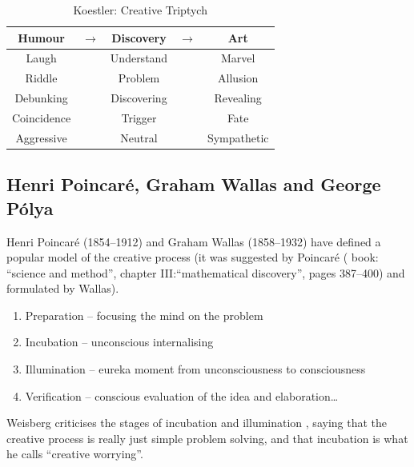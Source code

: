 \begin{table}[htbp]
  \centering
  \begin{tabu}{ccccc}
  \toprule
  \textbf{Humour} & $\to$ & \textbf{Discovery} & $\to$ & \textbf{Art} \\
  \midrule
  Laugh           && Understand         && Marvel       \\
  Riddle          && Problem            && Allusion     \\
  Debunking       && Discovering        && Revealing    \\
  Coincidence     && Trigger            && Fate         \\
  Aggressive      && Neutral            && Sympathetic  \\
  \bottomrule
  \end{tabu}
\caption[Creative Triptych]{Koestler: Creative Triptych}
\label{KHDA}
\end{table}


\subsection*{Henri Poincaré, Graham Wallas and George Pólya}

Henri Poincaré (1854--1912) \autocite{Poincare2001} and Graham Wallas (1858--1932) \autocite{Wallas1926} have defined a popular model \autocite{Boden2003, Koestler1964, Partridge1994} of the creative process (it was suggested by Poincaré  (\autocite{Poincare2001} book: ``science and method'', chapter III:\@``mathematical discovery'', pages 387--400) and formulated by Wallas).


\begin{enumerate}
  \item Preparation – focusing the mind on the problem
  \item Incubation – unconscious internalising
  \item Illumination – eureka moment from unconsciousness to consciousness
  \item Verification – conscious evaluation of the idea and elaboration…
\end{enumerate}

Weisberg criticises the stages of incubation and illumination \autocite[referred to by][]{Partridge1994}, saying that the creative process is really just simple problem solving, and that incubation is what he calls ``creative worrying''.

